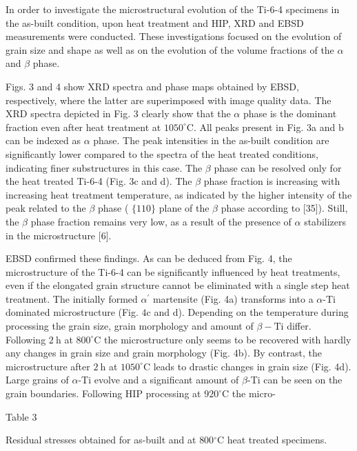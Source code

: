 \documentclass[10pt]{article}
\begin{document}
In order to investigate the microstructural evolution of the Ti-6-4 specimens in the as-built condition, upon heat treatment and HIP, XRD and EBSD measurements were conducted. These investigations focused on the evolution of grain size and shape as well as on the evolution of the volume fractions of the $\alpha$ and $\beta$ phase.

Figs. 3 and 4 show XRD spectra and phase maps obtained by EBSD, respectively, where the latter are superimposed with image quality data. The XRD spectra depicted in Fig. 3 clearly show that the $\alpha$ phase is the dominant fraction even after heat treatment at $1050^{\circ} \mathrm{C}$. All peaks present in Fig. 3a and $\mathrm{b}$ can be indexed as $\alpha$ phase. The peak intensities in the as-built condition are significantly lower compared to the spectra of the heat treated conditions, indicating finer substructures in this case. The $\beta$ phase can be resolved only for the heat treated Ti-6-4 (Fig. 3c and d). The $\beta$ phase fraction is increasing with increasing heat treatment temperature, as indicated by the higher intensity of the peak related to the $\beta$ phase ( $\{110\}$ plane of the $\beta$ phase according to [35]). Still, the $\beta$ phase fraction remains very low, as a result of the presence of $\alpha$ stabilizers in the microstructure [6].

EBSD confirmed these findings. As can be deduced from Fig. 4, the microstructure of the Ti-6-4 can be significantly influenced by heat treatments, even if the elongated grain structure cannot be eliminated with a single step heat treatment. The initially formed $\alpha^{\prime}$ martensite (Fig. 4a) transforms into a $\alpha$-Ti dominated microstructure (Fig. $4 \mathrm{c}$ and d). Depending on the temperature during processing the grain size, grain morphology and amount of $\beta-\mathrm{Ti}$ differ. Following $2 \mathrm{~h}$ at $800^{\circ} \mathrm{C}$ the microstructure only seems to be recovered with hardly any changes in grain size and grain morphology (Fig. 4b). By contrast, the microstructure after $2 \mathrm{~h}$ at $1050^{\circ} \mathrm{C}$ leads to drastic changes in grain size (Fig. 4d). Large grains of $\alpha$-Ti evolve and a significant amount of $\beta$-Ti can be seen on the grain boundaries. Following HIP processing at $920^{\circ} \mathrm{C}$ the micro-

Table 3

Residual stresses obtained for as-built and at $800{ }^{\circ} \mathrm{C}$ heat treated specimens.
\end{document}
